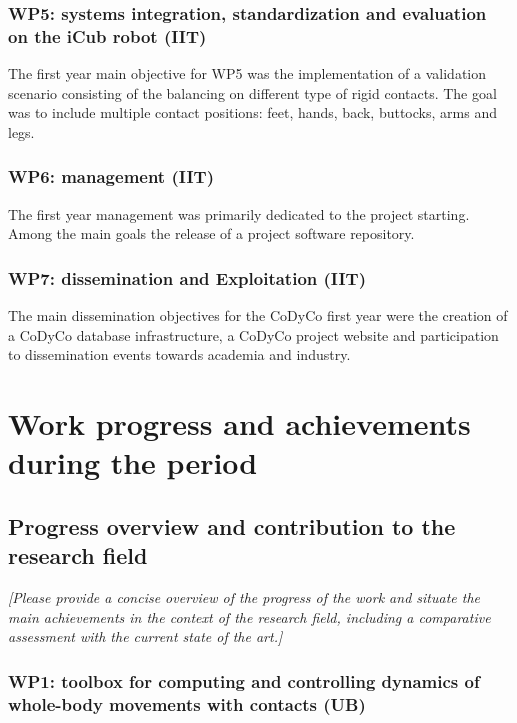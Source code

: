 \documentclass[12pt,a4paper,twoside]{article}
\begin{document}
\subsubsection{WP5: systems integration, standardization and evaluation on the iCub robot (IIT)}

The first year main objective for WP5 was the implementation of a validation scenario consisting of the balancing on different type of rigid contacts. The goal was to include multiple contact positions: feet, hands, back, buttocks, arms and legs. 


\subsubsection{WP6: management (IIT)}

The first year management was primarily dedicated to the project starting. Among the main goals the release of a project software repository.


\subsubsection{WP7: dissemination and Exploitation (IIT)}

The main dissemination objectives for the CoDyCo first year were the creation of a CoDyCo database infrastructure, a CoDyCo project website and participation to dissemination events towards academia and industry. 

\section{Work progress and achievements during the period}

\subsection{Progress overview and contribution to the research field}

\emph{\color{red}[Please provide a concise overview of the progress of the work and situate the main achievements in the context of the research field, including a comparative assessment with the current state of the art.]}

\subsubsection{WP1: toolbox for computing and controlling dynamics of whole-body movements with contacts (UB)}
\end{document}
